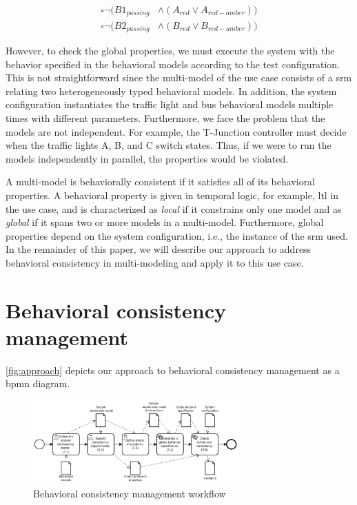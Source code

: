 \documentclass{jot}
\begin{document}
\begin{align}
    \square\neg(B1_{passing} & \land (A_{red} \lor A_{red-amber})) \label{eq:property3} \\
    \square\neg(B2_{passing} & \land (B_{red} \lor B_{red-amber})) \label{eq:property4}
\end{align}

However, to check the global properties, we must execute the system with the behavior specified in the behavioral models according to the test configuration.
This is not straightforward since the multi-model of the use case consists of a \gls*{srm} relating two heterogeneously typed behavioral models.
In addition, the system configuration instantiates the traffic light and bus behavioral models multiple times with different parameters.
Furthermore, we face the problem that the models are not independent.
For example, the T-Junction controller must decide when the traffic lights A, B, and C switch states.
Thus, if we were to run the models independently in parallel, the properties would be violated.

A multi-model is behaviorally consistent if it satisfies all of its behavioral properties.
A behavioral property is given in temporal logic, for example, \gls*{ltl} in the use case, and is characterized as \textit{local} if it constrains only one model and as \textit{global} if it spans two or more models in a multi-model.
Furthermore, global properties depend on the system configuration, i.e., the instance of the \gls*{srm} used.
In the remainder of this paper, we will describe our approach to address behavioral consistency in multi-modeling and apply it to this use case.


\section{Behavioral consistency management} \label{sec:behavioral_consistency_checking}

\autoref{fig:approach} depicts our approach to behavioral consistency management as a \gls*{bpmn} diagram.

\begin{figure}[h]
    \centering
    \includegraphics[width=0.7\textwidth]{figures/workflow.pdf}
    \caption{Behavioral consistency management workflow}
    \label{fig:approach}
\end{figure}
\end{document}
